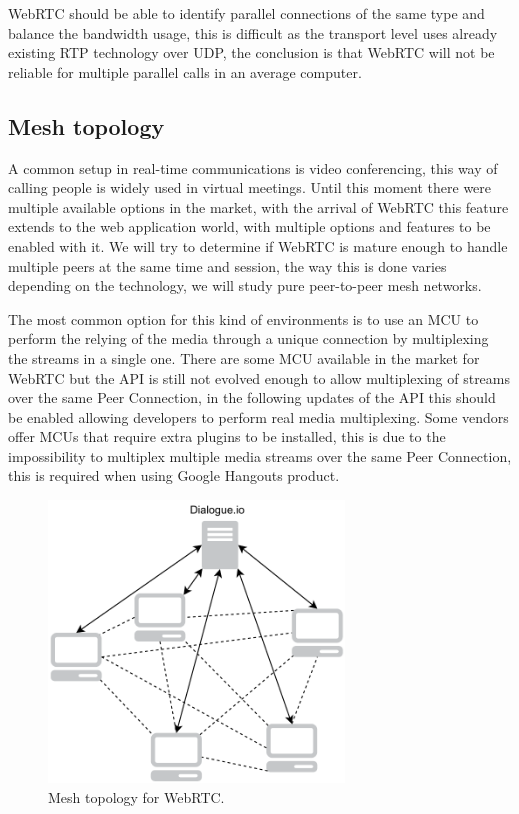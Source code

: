 WebRTC should be able to identify parallel connections of the same type and balance the bandwidth usage, this is difficult as the transport level uses already existing RTP technology over UDP, the conclusion is that WebRTC will not be reliable for multiple parallel calls in an average computer.

\subsection{Mesh topology}

A common setup in real-time communications is video conferencing, this way of calling people is widely used in virtual meetings. Until this moment there were multiple available options in the market, with the arrival of WebRTC this feature extends to the web application world, with multiple options and features to be enabled with it. We will try to determine if WebRTC is mature enough to handle multiple peers at the same time and session, the way this is done varies depending on the technology, we will study pure peer-to-peer mesh networks.

The most common option for this kind of environments is to use an MCU to perform the relying of the media through a unique connection by multiplexing the streams in a single one. There are some MCU available in the market for WebRTC but the API is still not evolved enough to allow multiplexing of streams over the same Peer Connection, in the following updates of the API this should be enabled allowing developers to perform real media multiplexing. Some vendors offer MCUs that require extra plugins to be installed, this is due to the impossibility to multiplex multiple media streams over the same Peer Connection, this is required when using Google Hangouts product.

\begin{figure}[h]
  \centering
    \includegraphics[width=0.7\textwidth]{./figures/mesh.pdf}
      \caption[Mesh topology for WebRTC]{Mesh topology for WebRTC.}
	\label{fig:meshTopology}
\end{figure}

